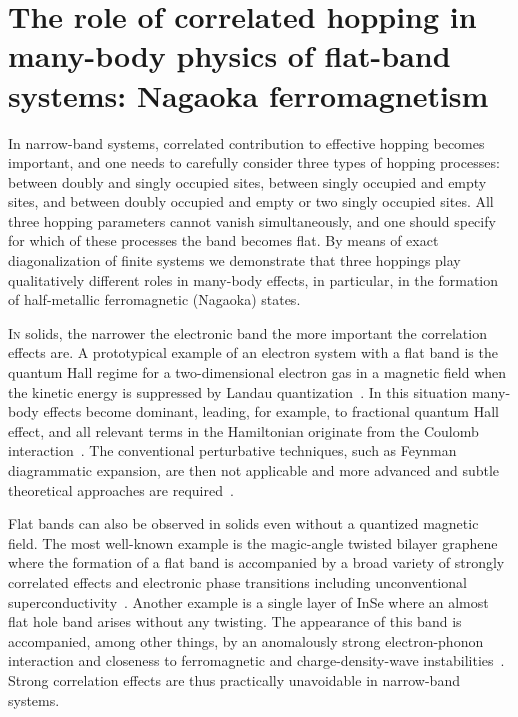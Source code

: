 \openleft%
\chapter[The role of correlated hopping in many-body physics of flat-band systems: Nagaoka ferromagnetism][Correlated hoppings in many-body physics of flat-band systems]{The role of correlated hopping in many-body physics of flat-band systems: Nagaoka ferromagnetism}\label{ch:corr-hops}

{\small In narrow-band systems, correlated contribution to effective hopping becomes important, and one needs to carefully consider three types of hopping processes: between doubly and singly occupied sites, between singly occupied and empty sites, and between doubly occupied and empty or two singly occupied sites. All three hopping parameters cannot vanish simultaneously, and one should specify for which of these processes the band becomes flat. By means of exact diagonalization of finite systems we demonstrate that three hoppings play qualitatively different roles in many-body effects, in particular, in the formation of half-metallic ferromagnetic (Nagaoka) states.}

\clearpage


\lettrine[lines=3]{I}{n} solids, the narrower the electronic band the more important the correlation effects are. A prototypical example of an electron system with a flat band is the quantum Hall regime for a two-dimensional electron gas in a magnetic field when the kinetic energy is suppressed by Landau quantization~\cite{quant_hall}. In this situation many-body effects become dominant, leading, for example, to fractional quantum Hall effect, and all relevant terms in the Hamiltonian originate from the Coulomb interaction~\cite{murthy}. The conventional perturbative techniques, such as Feynman diagrammatic expansion, are then not applicable and more advanced and subtle theoretical approaches are required~\cite{hansson}. 

Flat bands can also be observed in solids even without a quantized magnetic field. The most well-known example is the magic-angle twisted bilayer graphene~\cite{suarez_morell_flat_2010,bistritzer_moire_2011,li_observation_2010} where the formation of a flat band is accompanied by a broad variety of strongly correlated effects and electronic phase transitions including unconventional superconductivity~\cite{cao_correlated_2018,cao_unconventional_2018,yankowitz_tuning_2019,sharpe_emergent_2019}. Another example is a single layer of InSe where an almost flat hole band arises without any twisting. The appearance of this band is accompanied, among other things, by an anomalously strong electron-phonon interaction and closeness to ferromagnetic and charge-density-wave instabilities~\cite{InSe1,InSe2}. Strong correlation effects are thus practically unavoidable in narrow-band systems.

